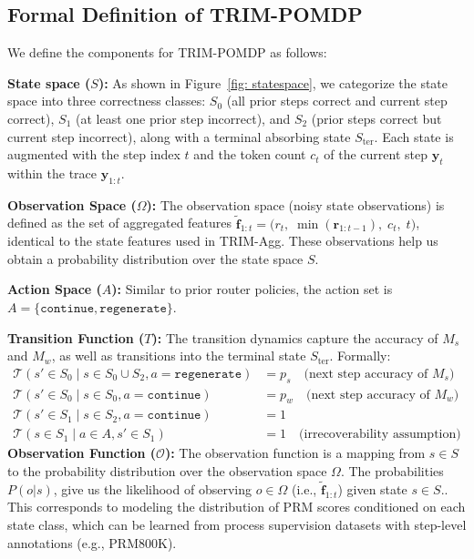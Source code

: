 \documentclass{article}
\theoremstyle{plain}
\theoremstyle{definition}
\theoremstyle{remark}
\newcommand{\cont}{\mathtt{continue}}
\newcommand{\regen}{\mathtt{regenerate}}
\begin{document}
\subsection{Formal Definition of TRIM-POMDP}
We define the components for TRIM-POMDP as follows:

\textbf{State space ($S$):}  As shown in Figure~\ref{fig: statespace}, we categorize the state space into three correctness classes: $S_0$ (all prior steps correct and current step correct), $S_1$ (at least one prior step incorrect), and $S_2$ (prior steps correct but current step incorrect), along with a terminal absorbing state $S_{\mathrm{ter}}$. Each state is augmented with the step index $t$ and the token count $c_t$ of the current step $\mathbf{y}_t$ within the trace $\mathbf{y}_{1:t}$.

\textbf{Observation Space ($\Omega$):} The observation space (noisy state observations) is defined as the set of aggregated features $\tilde{\mathbf{f}}_{1:t} = \big(r_t,\; \min(\mathbf{r}_{1:t-1}),\; c_t,\; t \big)$, identical to the state features used in TRIM-Agg. These observations help us obtain a probability distribution over the state space $S.$

\textbf{Action Space ($A$):} Similar to prior router policies, the action set is $A=\{\cont, \regen\}$.

\textbf{Transition Function ($T$):} The transition dynamics capture the accuracy of $M_s$ and $M_w$, as well as transitions into the terminal state $S_{\mathrm{ter}}$. Formally:
\begin{align*}
        \mathcal{T}(s'\in S_0\mid s \in S_0 \cup S_2,a=\regen) &= p_{s} \quad \text{(next step accuracy of $M_s$)}\\
        \mathcal{T}(s'\in S_0 \mid s \in S_0,a=\cont) &= p_{w} \quad \text{(next step accuracy of $M_w$)}\\
        \mathcal{T}(s'\in S_1 \mid s \in S_2,a=\cont) &= 1 \\
        \mathcal{T}(s \in S_1 \mid a\in A, s'\in S_1) &= 1 \quad \text{(irrecoverability assumption)}
\end{align*}
\textbf{Observation Function ($\mathcal{O}$):} The observation function is a mapping from $s \in S$ to the probability distribution over the observation space $\Omega$. The probabilities $P(o|s)$, give us the likelihood of observing $o \in \Omega$ (i.e., $\tilde{\mathbf{f}}_{1:t}$) given state $s \in S.$. This corresponds to modeling the distribution of PRM scores conditioned on each state class, which can be learned from process supervision datasets with step-level annotations (e.g., PRM800K).
\end{document}
